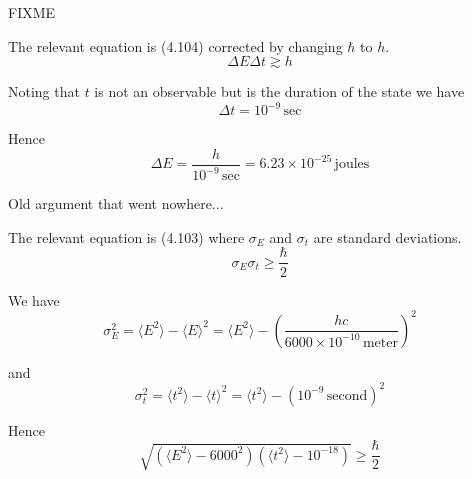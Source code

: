 


\bigskip
FIXME

\bigskip
The relevant equation is (4.104) corrected by changing $\hbar$ to $h$.
\begin{equation*}
\Delta E\Delta t\gtrsim h
\end{equation*}

Noting that $t$ is not an observable but is the duration of the state we have
\begin{equation*}
\Delta t=10^{-9}\,\text{sec}
\end{equation*}

Hence
\begin{equation*}
\Delta E=\frac{h}{10^{-9}\,\text{sec}}
=6.23\times10^{-25}\,\text{joules}
\end{equation*}


\bigskip
Old argument that went nowhere...

\bigskip
The relevant equation is (4.103) where $\sigma_E$ and $\sigma_t$
are standard deviations.
\begin{equation*}
\sigma_E\sigma_t\ge\frac{\hbar}{2}
\end{equation*}

We have
\begin{equation*}
\sigma_E^2=\langle E^2\rangle-\langle E\rangle^2
=\langle E^2\rangle-\left(\frac{hc}{6000\times10^{-10}\,\text{meter}}\right)^2
\end{equation*}

and
\begin{equation*}
\sigma_t^2=\langle t^2\rangle-\langle t\rangle^2
=\langle t^2\rangle-\left(10^{-9}\,\text{second}\right)^2
\end{equation*}

Hence
\begin{equation*}
\sqrt{(\langle E^2\rangle-6000^2)(\langle t^2\rangle-10^{-18})}\ge\frac{\hbar}{2}
\end{equation*}


